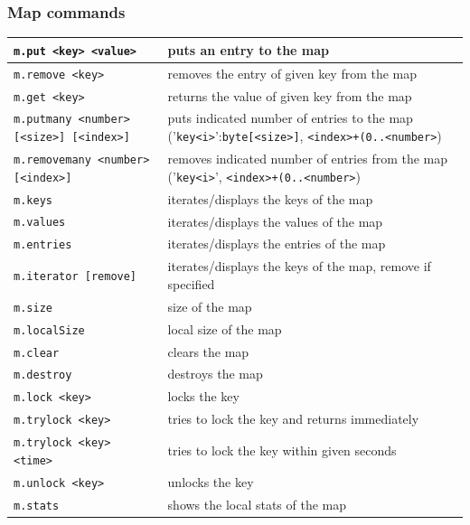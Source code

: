 \subsubsection*{Map commands}
\begin{tabular}{|p{}|p{}|}
    \hline
    \texttt{m.put <key> <value>} & puts an entry to the map\\\hline
    \texttt{m.remove <key>} & removes the entry of given key from the map\\\hline
    \texttt{m.get <key>} & returns the value of given key from the map\\\hline
    \texttt{m.putmany <number> [<size>] [<index>]} & puts indicated number of entries to the map ('\texttt{key<i>}':\texttt{byte[<size>]}, \texttt{<index>+(0..<number>})\\\hline
    \texttt{m.removemany <number> [<index>]} & removes indicated number of entries from the map ('\texttt{key<i>}', \texttt{<index>+(0..<number>})\\\hline
    \texttt{m.keys} & iterates/displays the keys of the map\\\hline
    \texttt{m.values} & iterates/displays the values of the map\\\hline
    \texttt{m.entries} & iterates/displays the entries of the map\\\hline
    \texttt{m.iterator [remove]} & iterates/displays the keys of the map, remove if specified\\\hline
    \texttt{m.size} & size of the map\\\hline
    \texttt{m.localSize} & local size of the map\\\hline
    \texttt{m.clear} & clears the map\\\hline
    \texttt{m.destroy} & destroys the map\\\hline
    \texttt{m.lock <key>} & locks the key\\\hline
    \texttt{m.trylock <key>} & tries to lock the key and returns immediately\\\hline
    \texttt{m.trylock <key> <time>} & tries to lock the key within given seconds\\\hline
    \texttt{m.unlock <key>} & unlocks the key\\\hline
    \texttt{m.stats} & shows the local stats of the map\\\hline
\end{tabular}
